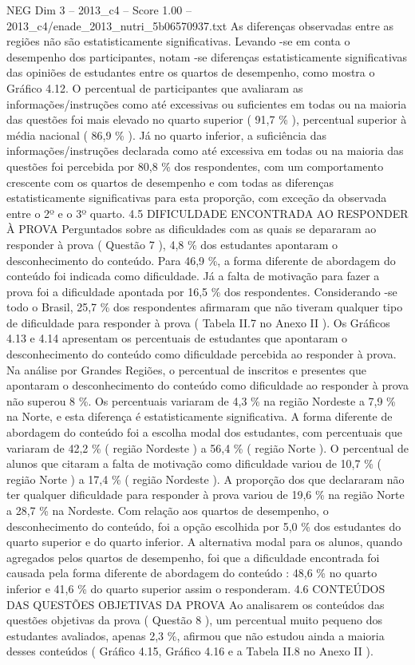 \begin{textsample}{NEG Dim 3 – 2013\_c4 – Score 1.00 – 2013\_c4/enade\_2013\_nutri\_5b06570937.txt}
As diferenças observadas entre as regiões não são estatisticamente significativas.
Levando -se em conta o desempenho dos participantes, notam -se diferenças estatisticamente significativas das opiniões de estudantes entre os quartos de desempenho, como mostra o Gráfico 4.12.
O percentual de participantes que avaliaram as informações/instruções como até excessivas ou suficientes em todas ou na maioria das questões foi mais elevado no quarto superior ( 91,7 \% ), percentual superior à média nacional ( 86,9 \% ).
Já no quarto inferior, a suficiência das informações/instruções declarada como até excessiva em todas ou na maioria das questões foi percebida por 80,8 \% dos respondentes, com um comportamento crescente com os quartos de desempenho e com todas as diferenças estatisticamente significativas para esta proporção, com exceção da observada entre o 2º e o 3º quarto. 4.5 DIFICULDADE ENCONTRADA AO RESPONDER À PROVA Perguntados sobre as dificuldades com as quais se depararam ao responder à prova ( Questão 7 ), 4,8 \% dos estudantes apontaram o desconhecimento do conteúdo.
Para 46,9 \%, a forma diferente de abordagem do conteúdo foi indicada como dificuldade.
Já a falta de motivação para fazer a prova foi a dificuldade apontada por 16,5 \% dos respondentes.
Considerando -se todo o Brasil, 25,7 \% dos respondentes afirmaram que não tiveram qualquer tipo de dificuldade para responder à prova ( Tabela II.7 no Anexo II ).
Os Gráficos 4.13 e 4.14 apresentam os percentuais de estudantes que apontaram o desconhecimento do conteúdo como dificuldade percebida ao responder à prova.
Na análise por Grandes Regiões, o percentual de inscritos e presentes que apontaram o desconhecimento do conteúdo como dificuldade ao responder à prova não superou 8 \%.
Os percentuais variaram de 4,3 \% na região Nordeste a 7,9 \% na Norte, e esta diferença é estatisticamente significativa.
A forma diferente de abordagem do conteúdo foi a escolha modal dos estudantes, com percentuais que variaram de 42,2 \% ( região Nordeste ) a 56,4 \% ( região Norte ).
O percentual de alunos que citaram a falta de motivação como dificuldade variou de 10,7 \% ( região Norte ) a 17,4 \% ( região Nordeste ).
A proporção dos que declararam não ter qualquer dificuldade para responder à prova variou de 19,6 \% na região Norte a 28,7 \% na Nordeste.
Com relação aos quartos de desempenho, o desconhecimento do conteúdo, foi a opção escolhida por 5,0 \% dos estudantes do quarto superior e do quarto inferior.
A alternativa modal para os alunos, quando agregados pelos quartos de desempenho, foi que a dificuldade encontrada foi causada pela forma diferente de abordagem do conteúdo : 48,6 \% no quarto inferior e 41,6 \% do quarto superior assim o responderam. 4.6 CONTEÚDOS DAS QUESTÕES OBJETIVAS DA PROVA Ao analisarem os conteúdos das questões objetivas da prova ( Questão 8 ), um percentual muito pequeno dos estudantes avaliados, apenas 2,3 \%, afirmou que não estudou ainda a maioria desses conteúdos ( Gráfico 4.15, Gráfico 4.16 e a Tabela II.8 no Anexo II ).

\end{textsample}
